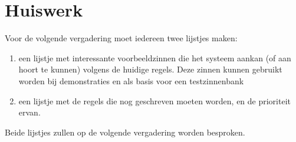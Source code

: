 \section{Huiswerk}
Voor de volgende vergadering moet iedereen twee lijstjes maken:
\begin{enumerate}
\item een lijstje met interessante voorbeeldzinnen die het systeem aankan 
(of aan hoort te 
kunnen) volgens de huidige regels. Deze zinnen kunnen gebruikt worden bij 
demonstraties en als basis voor een testzinnenbank
\item een lijstje met de regels die nog geschreven moeten worden, en de 
prioriteit ervan.
\end{enumerate}
Beide lijstjes zullen op de volgende vergadering worden besproken.



